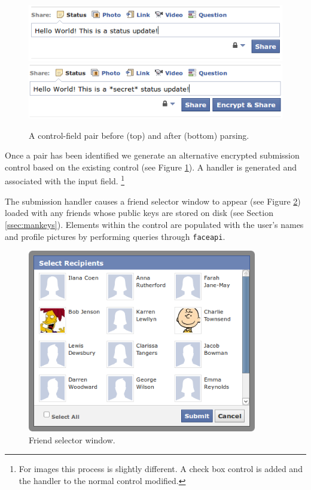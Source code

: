     \begin{figure}[tbph]
        \begin{center}
                \includegraphics[width=12cm]{screens/control1.png}
                \includegraphics[width=12cm]{screens/control2.png}
            \caption{A control-field pair before (top) and after (bottom) parsing.}
            \label{scn:ctrl}
        \end{center}
    \end{figure}

Once a pair has been identified we generate an alternative encrypted submission control based on the existing control (see Figure \ref{scn:ctrl}). A handler is generated and associated with the input field. \footnote{For images this process is slightly different. A check box control is added and the handler to the normal control modified.}

The submission handler causes a friend selector window to appear (see Figure \ref{scn:fselector}) loaded with any friends whose public keys are stored on disk (see Section \ref{ssec:mankeys}). Elements within the control are populated with the user's names and profile pictures by performing queries through {\tt faceapi}.

    \begin{figure}[tbph]
        \begin{center}
                \includegraphics[width=10cm]{screens/fselector.png}
            \caption{Friend selector window.}
            \label{scn:fselector}
        \end{center}
    \end{figure}

